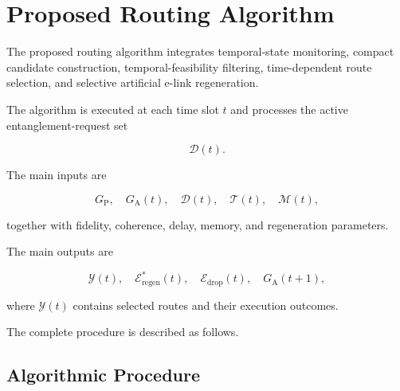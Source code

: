 \section{Proposed Routing Algorithm}

The proposed routing algorithm integrates temporal-state monitoring, compact candidate construction, temporal-feasibility filtering, time-dependent route selection, and selective artificial e-link regeneration.

The algorithm is executed at each time slot $t$ and processes the active entanglement-request set

\begin{equation}
    \mathcal{D}(t).
\end{equation}

The main inputs are

\begin{equation}
    G_{\mathrm{P}},
    \quad
    G_{\mathrm{A}}(t),
    \quad
    \mathcal{D}(t),
    \quad
    \mathcal{T}(t),
    \quad
    \mathcal{M}(t),
\end{equation}

together with fidelity, coherence, delay, memory, and regeneration parameters.

The main outputs are

\begin{equation}
    \mathcal{Y}(t),
    \quad
    \mathcal{E}_{\mathrm{regen}}^{*}(t),
    \quad
    \mathcal{E}_{\mathrm{drop}}(t),
    \quad
    G_{\mathrm{A}}(t+1),
\end{equation}

where $\mathcal{Y}(t)$ contains selected routes and their execution outcomes.

The complete procedure is described as follows.


\subsection{Algorithmic Procedure}

